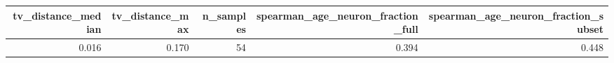\begin{tabular}{rrrrr}
\toprule
tv_distance_median & tv_distance_max & n_samples & spearman_age_neuron_fraction_full & spearman_age_neuron_fraction_subset \\
\midrule
0.016 & 0.170 & 54 & 0.394 & 0.448 \\
\bottomrule
\end{tabular}
